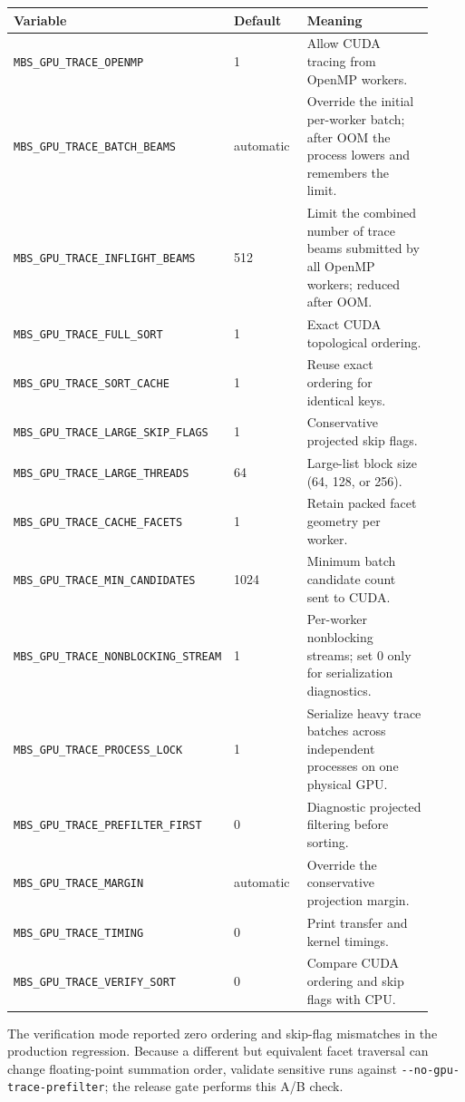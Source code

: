 \documentclass[
  10pt,
  a4paper,
]{article}
\begin{document}
\begin{longtable}[]{@{}L{0.38\linewidth}L{0.18\linewidth}L{0.36\linewidth}@{}}
\toprule\noalign{}
Variable & Default & Meaning \\
\midrule\noalign{}
\endhead
\bottomrule\noalign{}
\endlastfoot
\nolinkurl{MBS_GPU_TRACE_OPENMP} & 1 & Allow CUDA tracing from OpenMP workers. \\
\nolinkurl{MBS_GPU_TRACE_BATCH_BEAMS} & automatic & Override the initial per-worker batch; after OOM the process lowers and remembers the limit. \\
\nolinkurl{MBS_GPU_TRACE_INFLIGHT_BEAMS} & 512 & Limit the combined number of trace beams submitted by all OpenMP workers; reduced after OOM. \\
\nolinkurl{MBS_GPU_TRACE_FULL_SORT} & 1 & Exact CUDA topological ordering. \\
\nolinkurl{MBS_GPU_TRACE_SORT_CACHE} & 1 & Reuse exact ordering for identical keys. \\
\nolinkurl{MBS_GPU_TRACE_LARGE_SKIP_FLAGS} & 1 & Conservative projected skip flags. \\
\nolinkurl{MBS_GPU_TRACE_LARGE_THREADS} & 64 & Large-list block size (64, 128, or 256). \\
\nolinkurl{MBS_GPU_TRACE_CACHE_FACETS} & 1 & Retain packed facet geometry per worker. \\
\nolinkurl{MBS_GPU_TRACE_MIN_CANDIDATES} & 1024 & Minimum batch candidate count sent to CUDA. \\
\nolinkurl{MBS_GPU_TRACE_NONBLOCKING_STREAM} & 1 & Per-worker nonblocking streams; set 0 only for serialization diagnostics. \\
\nolinkurl{MBS_GPU_TRACE_PROCESS_LOCK} & 1 & Serialize heavy trace batches across independent processes on one physical GPU. \\
\nolinkurl{MBS_GPU_TRACE_PREFILTER_FIRST} & 0 & Diagnostic projected filtering before sorting. \\
\nolinkurl{MBS_GPU_TRACE_MARGIN} & automatic & Override the conservative projection margin. \\
\nolinkurl{MBS_GPU_TRACE_TIMING} & 0 & Print transfer and kernel timings. \\
\nolinkurl{MBS_GPU_TRACE_VERIFY_SORT} & 0 & Compare CUDA ordering and skip flags with CPU. \\
\end{longtable}

The verification mode reported zero ordering and skip-flag mismatches in the
production regression. Because a different but equivalent facet traversal can
change floating-point summation order, validate sensitive runs against
\nolinkurl{--no-gpu-trace-prefilter}; the release gate performs this A/B check.
\end{document}
